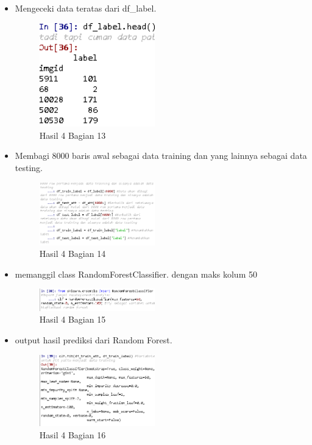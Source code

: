 \begin{itemize}
\item Mengeceki data teratas dari df\_label.

\begin{figure}[H]
\centerline{\includegraphics[width=5cm]{figures/1174079/3/praktek15.PNG}}
\caption{Hasil 4 Bagian 13}
\label{labelgambar}
\end{figure}

\item Membagi 8000 baris awal sebagai data training dan yang lainnya sebagai data testing.

\begin{figure}[H]
\centerline{\includegraphics[width=5cm]{figures/1174079/3/praktek16.PNG}}
\caption{Hasil 4 Bagian 14}
\label{labelgambar}
\end{figure}

\item memanggil class RandomForestClassifier. dengan maks kolum 50

\begin{figure}[H]
\centerline{\includegraphics[width=5cm]{figures/1174079/3/praktek17.PNG}}
\caption{Hasil 4 Bagian 15}
\label{labelgambar}
\end{figure}

\item output hasil prediksi dari Random Forest.

\begin{figure}[H]
\centerline{\includegraphics[width=5cm]{figures/1174079/3/praktek18.PNG}}
\caption{Hasil 4 Bagian 16}
\label{labelgambar}
\end{figure}


\end{itemize}
